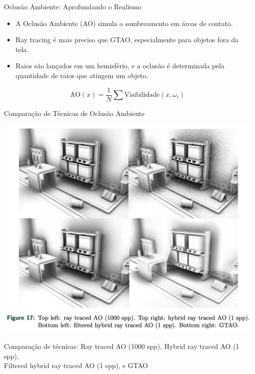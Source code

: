 \documentclass[aspectratio=169,xcolor=table]{beamer}
\begin{document}
\begin{frame}{Oclusão Ambiente: Aprofundando o Realismo}
    \begin{itemize}
        \item A Oclusão Ambiente (AO) simula o sombreamento em áreas de contato.
        \item Ray tracing é mais preciso que GTAO, especialmente para objetos fora da tela.
        \item Raios são lançados em um hemisfério, e a oclusão é determinada pela quantidade de raios que atingem um objeto.
    \end{itemize}
    \begin{equation*}
        \text{AO}(x) = \frac{1}{N} \sum \text{Visibilidade}(x, \omega_i)
    \end{equation*}
\end{frame}

\begin{frame}{Comparação de Técnicas de Oclusão Ambiente}
    \begin{center}
        \includegraphics[height=0.7\textheight]{ambient-occlusion}
    \end{center}
    \begin{center}
        \small{Comparação de técnicas: Ray traced AO (1000 spp), Hybrid ray traced AO (1 spp),\\
        Filtered hybrid ray traced AO (1 spp), e GTAO}
    \end{center}
\end{frame}
\end{document}
